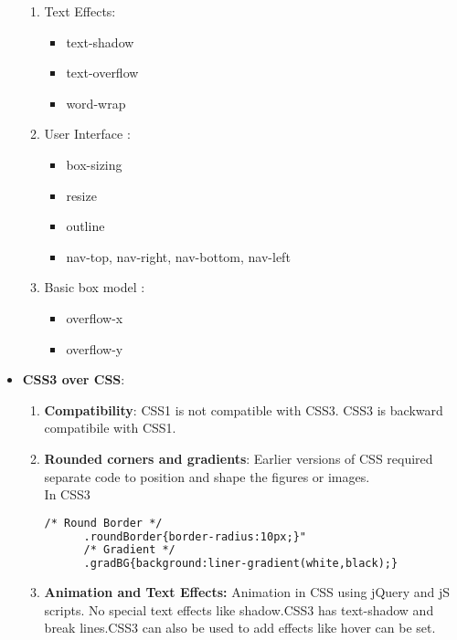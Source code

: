 \begin{itemize}
\begin{enumerate}
	 	\item Text Effects:
	 	\begin{itemize}
	 		\item text-shadow
	 		\item text-overflow
	 		\item word-wrap	
	 	\end{itemize}
 	    \item User Interface :
 	    \begin{itemize}
 	    	\item box-sizing
 	    	\item resize
 	    	\item outline
 	    	\item nav-top, nav-right, nav-bottom, nav-left
 	    \end{itemize}
       \item Basic box model :
       \begin{itemize}
           \item overflow-x
           \item overflow-y
       \end{itemize}
	\end{enumerate} 
\item \textbf{CSS3 over CSS}:
\begin{enumerate}
	\item \textbf{Compatibility}:
	CSS1 is not compatible with CSS3. CSS3 is backward compatibile with CSS1.
	\item \textbf{Rounded corners and gradients}:
	Earlier versions of CSS required separate code to position and shape the figures or images.\\ In CSS3 
	\begin{lstlisting}[language=html,numbers=none,style=base]
	  /* Round Border */
      .roundBorder{border-radius:10px;}"
      /* Gradient */   
      .gradBG{background:liner-gradient(white,black);}
	\end{lstlisting}
	\item \textbf{Animation and Text Effects:}
	Animation in CSS using jQuery and jS scripts. No special text effects like shadow.CSS3 has text-shadow and break lines.CSS3 can also be used to add effects like hover can be set.
\end{enumerate}
\end{itemize}
